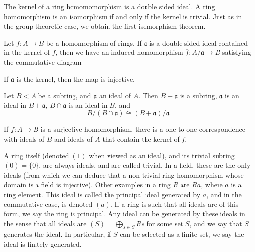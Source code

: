 The kernel of a ring homomomorphism is a double sided ideal. A ring homomorphism is an isomorphism if and only if the kernel is trivial. Just as in the group-theoretic case, we obtain the first isomorphism theorem.

\begin{theorem}
    Let $f:A \to B$ be a homomorphism of rings. If $\mathfrak{a}$ is a double-sided ideal contained in the kernel of $f$, then we have an induced homomorphism $\overline{f}: A/\mathfrak{a} \to B$ satisfying the commutative diagram
    \begin{center}
    \end{center}
    If $\mathfrak{a}$ is the kernel, then the map is injective.
\end{theorem}

\begin{theorem}
    Let $B < A$ be a subring, and $\mathfrak{a}$ an ideal of $A$. Then $B + \mathfrak{a}$ is a subring, $\mathfrak{a}$ is an ideal in $B + \mathfrak{a}$, $B \cap \mathfrak{a}$ is an ideal in $B$, and
    \[ B/(B \cap \mathfrak{a}) \cong (B + \mathfrak{a})/\mathfrak{a} \]
\end{theorem}

\begin{theorem}
    If $f:A \to B$ is a surjective homomorphism, there is a one-to-one correspondence with ideals of $B$ and ideals of $A$ that contain the kernel of $f$.
\end{theorem}

A ring itself (denoted $(1)$ when viewed as an ideal), and its trivial subring $(0) = \{ 0 \}$, are always ideals, and are called trivial. In a field, these are the only ideals (from which we can deduce that a non-trivial ring homomorphism whose domain is a field is injective). Other examples in a ring $R$ are $Ra$, where $a$ is a ring element. This ideal is called the principal ideal generated by $a$, and in the commutative case, is denoted $(a)$. If a ring is such that all ideals are of this form, we say the ring is principal. Any ideal can be generated by these ideals in the sense that all ideals are $(S) = \bigoplus_{s \in S} Rs$ for some set $S$, and we say that $S$ generates the ideal. In particular, if $S$ can be selected as a finite set, we say the ideal is finitely generated.

